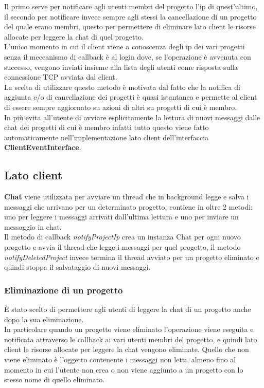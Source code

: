 \documentclass[11pt]{report}
\begin{document}
	Il primo serve per notificare agli utenti membri del progetto l'ip di quest'ultimo, il secondo per notificare invece sempre agli stessi la cancellazione di un progetto del quale erano membri, questo per permettere di eliminare lato client le risorse allocate per leggere la chat di quel progetto.\\
	L'unico momento in cui il client viene a conoscenza degli ip dei vari progetti senza il meccanismo di callback è al login dove, se l'operazione è avvenuta con successo, vengono inviati insieme alla lista degli utenti come risposta sulla connessione TCP avviata dal client.\\
	La scelta di utilizzare questo metodo è motivata dal fatto che la notifica di aggiunta e/o di cancellazione dei progetti è quasi istantanea e permette al client di essere sempre aggiornato su azioni di altri su progetti di cui è membro. \\
	In più evita all'utente di avviare esplicitamente la lettura di nuovi messaggi dalle chat dei progetti di cui è membro infatti tutto questo viene fatto automaticamente nell'implementazione lato client dell'interfaccia \textbf{ClientEventInterface}.
	
	\subsection{Lato client}
	\textbf{Chat} viene utilizzata per avviare un thread che in background legge e salva i messaggi che arrivano per un determinato progetto, contiene in oltre 2 metodi: uno per leggere i messaggi arrivati dall'ultima lettura e uno per inviare un messaggio in chat. \\
	Il metodo di callback \textit{notifyProjectIp} crea un instanza Chat per ogni nuovo progetto e avvia il thread che legge i messaggi per quel progetto, il metodo \textit{notifyDeletedProject} invece termina il thread avviato per un progetto eliminato e quindi stoppa il salvataggio di nuovi messaggi.
	
	\subsubsection{Eliminazione di un progetto}
	È stato scelto di permettere agli utenti di leggere la chat di un progetto anche dopo la sua eliminazione.\\
	In particolare quando un progetto viene eliminato l'operazione viene eseguita e notificata attraverso le callback ai vari utenti membri del progetto, e quindi lato client le risorse allocate per leggere la chat vengono eliminate. Quello che non viene eliminato è l'oggetto contenente i messaggi non letti, almeno fino al momento in cui l'utente non crea o non viene aggiunto a un progetto con lo stesso nome di quello eliminato.
	
\end{document}
